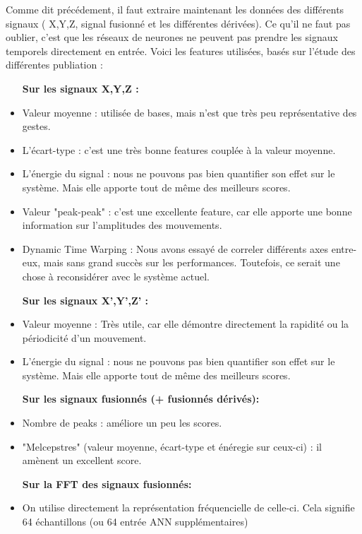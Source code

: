 Comme dit précédement, il faut extraire maintenant les données des différents signaux ( X,Y,Z, signal fusionné et les différentes dérivées). Ce qu'il ne faut pas oublier, c'est que les réseaux de neurones ne peuvent pas prendre les signaux temporels directement en entrée. Voici les features utilisées, basés sur l'étude des différentes publiation :
\begin{itemize}
\item[\textbf{Sur les signaux X,Y,Z :}]
\item Valeur moyenne : utilisée de bases, mais n'est que très peu représentative des gestes.
\item L'écart-type : c'est une très bonne features couplée à la valeur moyenne.
\item L'énergie du signal : nous ne pouvons pas bien quantifier son effet sur le système. Mais elle apporte tout de même des meilleurs scores.
\item Valeur "peak-peak" : c'est une excellente feature, car elle apporte une bonne information sur l'amplitudes des mouvements.
\item Dynamic Time Warping : Nous avons essayé de correler différents axes entre-eux, mais sans grand succès sur les performances. Toutefois, ce serait une chose à reconsidérer avec le système actuel.\pagebreak

\item[\textbf{Sur les signaux X',Y',Z' :}]
\item Valeur moyenne : Très utile, car elle démontre directement la rapidité ou la périodicité d'un mouvement.
\item L'énergie du signal : nous ne pouvons pas bien quantifier son effet sur le système. Mais elle apporte tout de même des meilleurs scores.\\

\item[\textbf{Sur les signaux fusionnés (+ fusionnés dérivés):}]
\item Nombre de peaks : améliore un peu les scores.
\item "Melcepstres" (valeur moyenne, écart-type et énéregie sur ceux-ci) : il amènent un excellent score. 

\item[\textbf{Sur la FFT des signaux fusionnés:}]
\item On utilise directement la représentation fréquencielle de celle-ci. Cela signifie 64 échantillons (ou 64 entrée ANN supplémentaires)
\end{itemize}

